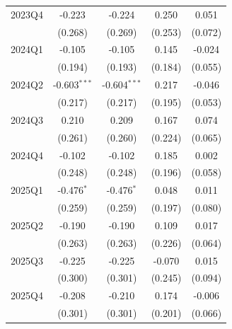 \begin{table}[htbp]
\begin{tabular}{lcccc}
2023Q4 & -0.223 & -0.224 & 0.250 & 0.051 \\
 & (0.268) & (0.269) & (0.253) & (0.072) \\
2024Q1 & -0.105 & -0.105 & 0.145 & -0.024 \\
 & (0.194) & (0.193) & (0.184) & (0.055) \\
2024Q2 & -0.603$^{***}$ & -0.604$^{***}$ & 0.217 & -0.046 \\
 & (0.217) & (0.217) & (0.195) & (0.053) \\
2024Q3 & 0.210 & 0.209 & 0.167 & 0.074 \\
 & (0.261) & (0.260) & (0.224) & (0.065) \\
2024Q4 & -0.102 & -0.102 & 0.185 & 0.002 \\
 & (0.248) & (0.248) & (0.196) & (0.058) \\
2025Q1 & -0.476$^{*}$ & -0.476$^{*}$ & 0.048 & 0.011 \\
 & (0.259) & (0.259) & (0.197) & (0.080) \\
2025Q2 & -0.190 & -0.190 & 0.109 & 0.017 \\
 & (0.263) & (0.263) & (0.226) & (0.064) \\
2025Q3 & -0.225 & -0.225 & -0.070 & 0.015 \\
 & (0.300) & (0.301) & (0.245) & (0.094) \\
2025Q4 & -0.208 & -0.210 & 0.174 & -0.006 \\
 & (0.301) & (0.301) & (0.201) & (0.066) \\
\bottomrule
\end{tabular}
\par\vspace{2pt}{\footnotesize Reference quarter 2022Q3 omitted. Standard errors clustered on occupation in parentheses. * p<0.10, ** p<0.05, *** p<0.01.}
\end{table}

